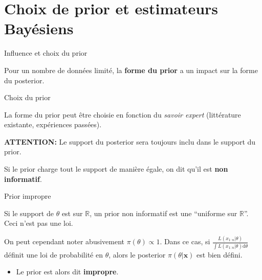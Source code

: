 \documentclass[9pt,ignorenonframetext,]{beamer}
\providecommand{\tightlist}{%
  \setlength{\itemsep}{0pt}\setlength{\parskip}{0pt}}
\begin{document}
\hypertarget{choix-de-prior-et-estimateurs-bayuxe9siens}{%
\section{Choix de prior et estimateurs
Bayésiens}\label{choix-de-prior-et-estimateurs-bayuxe9siens}}

\begin{frame}{Influence et choix du prior}
\protect\hypertarget{influence-et-choix-du-prior}{}

Pour un nombre de données limité, la \textbf{forme du prior} a un impact
sur la forme du posterior.

\pause

\begin{block}{Choix du prior}

La forme du prior peut être choisie en fonction du \emph{savoir expert}
(littérature existante, expériences passées).

\textbf{ATTENTION:} Le support du posterior sera toujours inclu dans le
support du prior.

\pause

Si le prior charge tout le support de manière égale, on dit qu'il est
\textbf{non informatif}.

\end{block}

\begin{block}{Prior impropre}

Si le support de \(\theta\) est sur \(\mathbb{R}\), un prior non
informatif est une ``uniforme sur \(\mathbb{R}\)''. Ceci n'est pas une
loi. \pause

On peut cependant noter abusivement \(\pi(\theta) \propto 1\). Dans ce
cas, si
\(\frac{L(x_{1:n} \vert \theta)}{\int L\left(x_{1:n} \vert \theta\right)\text{d} \theta}\)
définit une loi de probabilité en \(\theta\), alors le posterior
\(\pi(\theta\vert \mathbf{x})\) est bien défini.

\begin{itemize}
\tightlist
\item
  Le prior est alors dit \textbf{impropre}.
\end{itemize}

\end{block}

\end{frame}
\end{document}
